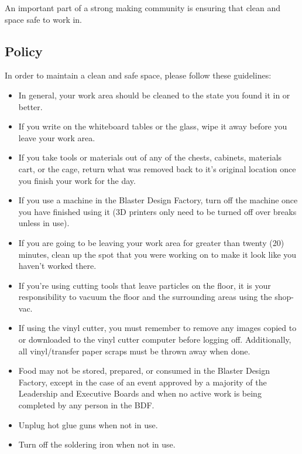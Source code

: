 \documentclass[12pt,letterpaper]{article}
\begin{document}
An important part of a strong making community is ensuring that clean and space safe to work in.

\subsection{Policy}

In order to maintain a clean and safe space, please follow these guidelines:
\begin{itemize}
    \item In general, your work area should be cleaned to the state you found it in or better. 
    \item If you write on the whiteboard tables or the glass, wipe it away before you leave your work area.
    \item If you take tools or materials out of any of the chests, cabinets, materials cart, or the cage, return what was removed back to it’s original location once you finish your work for the day.
    \item If you use a machine in the Blaster Design Factory, turn off the machine once you have finished using it (3D printers only need to be turned off over breaks unless in use).
    \item If you are going to be leaving your work area for greater than twenty (20) minutes, clean up the spot that you were working on to make it look like you haven’t worked there. 
    \item If you’re using cutting tools that leave particles on the floor, it is your responsibility to vacuum the floor and the surrounding areas using the shop-vac.
    \item If using the vinyl cutter, you must remember to remove any images copied to or downloaded to the vinyl cutter computer before logging off. Additionally, all vinyl/transfer paper scraps must be thrown away when done.
    \item Food may not be stored, prepared, or consumed in the Blaster Design Factory, except in the case of an event approved by a majority of the Leadership and Executive Boards and when no active work is being completed by any person in the BDF.
    \item Unplug hot glue guns when not in use.
    \item Turn off the soldering iron when not in use.
\end{itemize}
\end{document}
